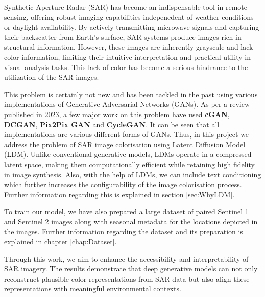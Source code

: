 Synthetic Aperture Radar (SAR) has become an indispensable tool in remote sensing, offering robust imaging capabilities indepenedent of weather conditions or daylight availability. By actively transmitting microwave signals and capturing their backscatter from Earth's surface, SAR systems produce images rich in structural information. However, these images are inherently grayscale and lack color information, limiting their intuitive interpretation and practical utility in visual analysis tasks. This lack of color has become a serious hindrance to the utilization of the SAR images.

This problem is certainly not new and has been tackled in the past using various implementations of Generative Adversarial Networks (GANs). As per a review published in 2023, a few major work on this problem have used \textbf{cGAN}, \textbf{DCGAN}, \textbf{Pix2Pix GAN} and \textbf{CycleGAN}\cite{SARReview}. It can be seen that all implementations are various different forms of GANs. Thus, in this project we address the problem of SAR image colorisation using Latent Diffusion Model (LDM). Unlike conventional generative models, LDMs operate in a compressed latent space, making them computationally efficient while retaining high fidelity in image synthesis. Also, with the help of LDMs, we can include text conditioning which further increases the configurability of the image colorisation process. Further information regarding this is explained in section \ref{sec:WhyLDM}.

To train our model, we have also prepared a large dataset of paired Sentinel 1 and Sentinel 2 images along with seasonal metadata for the locations depicted in the images. Further information regarding the dataset and its preparation is explained in chapter \ref{chap:Dataset}.

Through this work, we aim to enhance the accessibility and interpretability of SAR imagery. The results demonstrate that deep generative models can not only reconstruct plausible color representations from SAR data but also align these representations with meaningful environmental contexts.